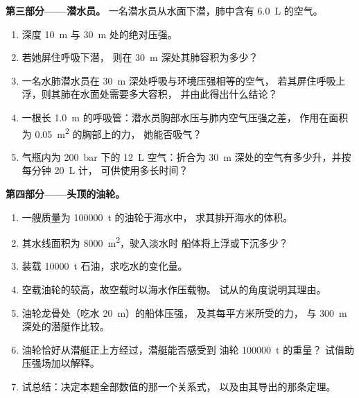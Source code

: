 \begin{problem}
\medskip
\noindent\textbf{第三部分——潜水员。}
一名潜水员从水面下潜，肺中含有 \qty{6.0}{L} 的空气。
\begin{enumerate}[resume]
  \item 深度 \qty{10}{m} 与 \qty{30}{m} 处的绝对压强。
  \item 若她屏住呼吸下潜，
        则在 \qty{30}{m} 深处其肺容积为多少？
  \item 一名水肺潜水员在 \qty{30}{m} 深处呼吸与环境压强相等的空气，
        若其屏住呼吸上浮，则其肺在水面处需要多大容积，
        并由此得出什么结论？
  \item 一根长 \qty{1.0}{m} 的呼吸管：潜水员胸部水压与肺内空气压强之差，
        作用在面积为 \qty{0.05}{m^2} 的胸部上的力，
        她能否吸气？
  \item 气瓶内为 \qty{200}{bar} 下的 \qty{12}{L} 空气：折合为
        \qty{30}{m} 深处的空气有多少升，并按每分钟 \qty{20}{L} 计，
        可供使用多长时间？
\end{enumerate}

\medskip
\noindent\textbf{第四部分——头顶的油轮。}
\begin{enumerate}[resume]
  \item 一艘质量为 \qty{100000}{t} 的油轮于海水中，
        求其排开海水的体积。
  \item 其水线面积为 \qty{8000}{m^2}，驶入淡水时
        船体将上浮或下沉多少？
  \item 装载 \qty{10000}{t} 石油，求吃水的变化量。
  \item 空载油轮的较高，故空载时以海水作压载物。
        试从的角度说明其理由。
  \item 油轮龙骨处（吃水 \qty{20}{m}）的船体压强，
        及其每平方米所受的力，
        与 \qty{300}{m} 深处的潜艇作比较。
  \item 油轮恰好从潜艇正上方经过，潜艇能否感受到
        油轮 \qty{100000}{t} 的重量？
        试借助压强场加以解释。
  \item 试总结：决定本题全部数值的那一个关系式，
        以及由其导出的那条定理。
\end{enumerate}
\end{problem}
